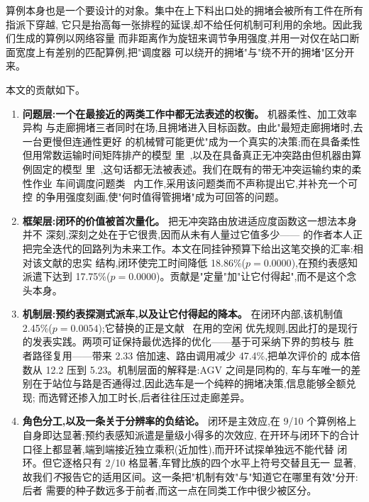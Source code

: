 \documentclass[manuscript,screen,review]{acmart}
\newcommand{\NCases}{10}
\newcommand{\GainLoopRule}{18.86\%}      %
\newcommand{\PLoopRule}{0.0000}
\newcommand{\GainLoopProbe}{17.75\%}     %
\newcommand{\PLoopProbe}{0.0000}
\newcommand{\GainProbeLoop}{2.45\%}      %
\newcommand{\PProbeLoop}{0.0054}
\newcommand{\CellsSigLoop}{9}
\newcommand{\CellsSigProbe}{2}
\newcommand{\SpeedupProbe}{2.33}
\newcommand{\RouteCallCut}{47.4\%}
\newcommand{\CostMultBefore}{12.2}
\newcommand{\CostMultAfter}{5.23}
\begin{document}
算例本身也是一个要设计的对象。集中在上下料出口处的拥堵会被所有工件在所有指派下穿越,
它只是抬高每一张排程的延误,却不给任何机制可利用的余地。因此我们生成的算例以网络容量
而非距离作为旋钮来调节争用强度,并用一对仅在站口断面宽度上有差别的匹配算例,把"调度器
可以绕开的拥堵"与"绕不开的拥堵"区分开来。

本文的贡献如下。

\begin{enumerate}[leftmargin=*]

\item \textbf{问题层:一个在最接近的两类工作中都无法表述的权衡。} 机器柔性、加工效率异构
与走廊拥堵三者同时在场,且拥堵进入目标函数。由此"最短走廊拥堵时,去一台更慢但连通性更好
的机械臂可能更优"成为一个真实的决策;而在具备柔性但用常数运输时间矩阵排产的模型
里~\cite{sun2023integrated},以及在具备真正无冲突路由但机器由算例固定的模型
里~\cite{li2026framework},这句话都无法被表述。我们在既有的带无冲突运输约束的柔性作业
车间调度问题类~\cite{vanos2026exact} 内工作,采用该问题类而不声称提出它,并补充一个可控
的争用强度刻画,使"何时值得管拥堵"成为可回答的问题。

\item \textbf{框架层:闭环的价值被首次量化。} 把无冲突路由放进适应度函数这一想法本身并不
深刻,深刻之处在于它很贵,因而从未有人量过它值多少——\cite{li2026framework} 的作者本人正
把完全迭代的回路列为未来工作。本文在同挂钟预算下给出这笔交换的汇率:相对该文献的忠实
结构,闭环使完工时间降低 \GainLoopRule{}($p=\PLoopRule$),在预约表感知派遣下达到
\GainLoopProbe{}($p=\PLoopProbe$)。贡献是"定量"加"让它付得起",而不是这个念头本身。

\item \textbf{机制层:预约表探测式派车,以及让它付得起的降本。} 在闭环内部,该机制值
\GainProbeLoop{}($p=\PProbeLoop$);它替换的正是文献~\cite{li2026framework} 在用的空闲
优先规则,因此打的是现行的发表实践。两项可证保持最优选择的优化——基于可采纳下界的剪枝与
胜者路径复用——带来 \SpeedupProbe{} 倍加速、路由调用减少 \RouteCallCut{},把单次评价的
成本倍数从 \CostMultBefore{} 压到 \CostMultAfter{}。机制层面的解释是:AGV 之间是同构的,
车与车唯一的差别在于站位与路是否通得过,因此选车是一个纯粹的拥堵决策,信息能够全额兑现;
而选臂还掺入加工时长,后者往往压过走廊差异。

\item \textbf{角色分工,以及一条关于分辨率的负结论。} 闭环是主效应,在
\CellsSigLoop{}/\NCases{} 个算例格上自身即达显著;预约表感知派遣是量级小得多的次效应,
在开环与闭环下的合计口径上都显著,端到端接近独立乘积(近加性),而开环试探单独远不能代替
闭环。但它逐格只有 \CellsSigProbe{}/\NCases{} 格显著,车臂比族的四个水平上符号交替且无一
显著,故我们\emph{不}报告它的适用区间。这一条把"机制有效"与"知道它在哪里有效"分开:后者
需要的种子数远多于前者,而这一点在同类工作中很少被区分。


\end{enumerate}
\end{document}
